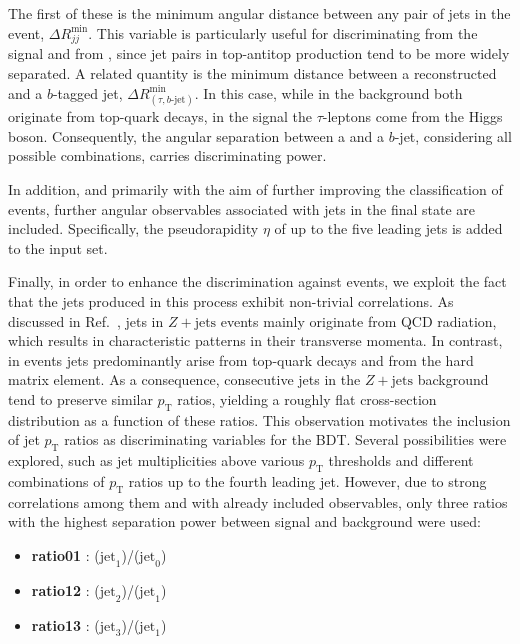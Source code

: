 The first of these is the minimum angular distance between any pair of jets in the event, $\Delta R^{\text{min}}_{jj}$. This variable is particularly useful for discriminating \ttbar from the signal and from \ztautau, since jet pairs in top-antitop production tend to be more widely separated. A related quantity is the minimum distance between a reconstructed \tauhad and a $b$-tagged jet, $\Delta R^{\text{min}}_{(\tau,b\text{-jet})}$. In this case, while in the \ttbar background both \tauhad originate from top-quark decays, in the \ttH signal the $\tau$-leptons come from the Higgs boson. Consequently, the angular separation between a \tauhad and a $b$-jet, considering all possible combinations, carries discriminating power. 

In addition, and primarily with the aim of further improving the classification of \ttbar events, further angular observables associated with jets in the final state are included. Specifically, the pseudorapidity $\eta$ of up to the five leading jets is added to the input set.

Finally, in order to enhance the discrimination against \ztautau events, we exploit the fact that the jets produced in this process exhibit non-trivial correlations. As discussed in Ref.~\cite{ztt_jets}, jets in $Z+\text{jets}$ events mainly originate from QCD radiation, which results in characteristic patterns in their transverse momenta. In contrast, in \ttH events jets predominantly arise from top-quark decays and from the hard matrix element. As a consequence, consecutive jets in the $Z+\text{jets}$ background tend to preserve similar $p_{\text{T}}$ ratios, yielding a roughly flat cross-section distribution as a function of these ratios. This observation motivates the inclusion of jet $p_{\text{T}}$ ratios as discriminating variables for the BDT.  
Several possibilities were explored, such as jet multiplicities above various $p_{\text{T}}$ thresholds and different combinations of $p_{\text{T}}$ ratios up to the fourth leading jet. However, due to strong correlations among them and with already included observables, only three ratios with the highest separation power between signal and background were used:
\begin{itemize}
    \small
    \item \textbf{ratio01} : \pt($\text{jet}_1$)/\pt($\text{jet}_0$)
    \item \textbf{ratio12} : \pt($\text{jet}_2$)/\pt($\text{jet}_1$)
    \item \textbf{ratio13} : \pt($\text{jet}_3$)/\pt($\text{jet}_1$)
\end{itemize}

